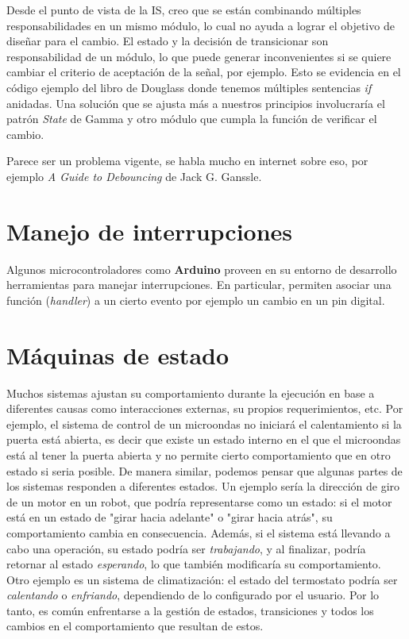 Desde el punto de vista de la IS, creo que se están combinando múltiples responsabilidades en un mismo módulo, lo cual no ayuda a lograr el objetivo de diseñar para el cambio. El estado y la decisión de transicionar son responsabilidad de un módulo, lo que puede generar inconvenientes si se quiere cambiar el criterio de aceptación de la señal, por ejemplo. Esto se evidencia en el código ejemplo del libro de Douglass donde tenemos múltiples sentencias \textit{if} anidadas. Una solución que se ajusta más a nuestros principios involucraría el patrón \textit{State} de Gamma y otro módulo que cumpla la función de verificar el cambio.

Parece ser un problema vigente, se habla mucho en internet sobre eso, por ejemplo \textit{A Guide to Debouncing} de Jack G. Ganssle.


\section{Manejo de interrupciones}
Algunos microcontroladores como \textbf{Arduino} proveen en su entorno de desarrollo herramientas para manejar interrupciones. En particular, permiten asociar una función (\textit{handler}) a un cierto evento por ejemplo un cambio en un pin digital.

\section{Máquinas de estado}\label{cap:state}


Muchos sistemas ajustan su comportamiento durante la ejecución en base a diferentes causas como interacciones externas, su propios requerimientos, etc. Por ejemplo, el sistema de control de un microondas no iniciará el calentamiento si la puerta está abierta, es decir que existe un estado interno en el que el microondas está al tener la puerta abierta y no permite cierto comportamiento que en otro estado si seria posible. De manera similar, podemos pensar que algunas partes de los sistemas responden a diferentes estados. Un ejemplo sería la dirección de giro de un motor en un robot, que podría representarse como un estado: si el motor está en un estado de "girar hacia adelante" o "girar hacia atrás", su comportamiento cambia en consecuencia. Además, si el sistema está llevando a cabo una operación, su estado podría ser \textit{trabajando}, y al finalizar, podría retornar al estado \textit{esperando}, lo que también modificaría su comportamiento. Otro ejemplo es un sistema de climatización: el estado del termostato podría ser \textit{calentando} o \textit{enfriando}, dependiendo de lo configurado por el usuario. Por lo tanto, es común enfrentarse a la gestión de estados, transiciones y todos los cambios en el comportamiento que resultan de estos.

